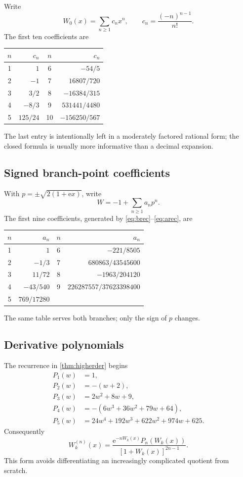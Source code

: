 \documentclass[11pt]{article}
\theoremstyle{remark}
\newcommand{\ee}{\mathrm e}
\begin{document}
Write
\[
       W_0(x)=\sum_{n\geq1}c_nx^n,
       \qquad c_n=\frac{(-n)^{n-1}}{n!}.
\]
The first ten coefficients are
\begin{center}
\begin{tabular}{@{}c r@{\qquad}c r@{}}
\toprule
\(n\)&\(c_n\)&\(n\)&\(c_n\)\\
\midrule
1&\(1\)&6&\(-54/5\)\\
2&\(-1\)&7&\(16807/720\)\\
3&\(3/2\)&8&\(-16384/315\)\\
4&\(-8/3\)&9&\(531441/4480\)\\
5&\(125/24\)&10&\(-156250/567\)\\
\bottomrule
\end{tabular}
\end{center}
The last entry is intentionally left in a moderately factored rational form;
the closed formula is usually more informative than a decimal expansion.

\subsection{Signed branch-point coefficients}

With \(p=\pm\sqrt{2(1+\ee x)}\), write
\[
       W=-1+\sum_{n\geq1}a_np^n.
\]
The first nine coefficients, generated by
\eqref{eq:brec}--\eqref{eq:arec}, are
\begin{center}
\begin{tabular}{@{}c r@{\qquad}c r@{}}
\toprule
\(n\)&\(a_n\)&\(n\)&\(a_n\)\\
\midrule
1&\(1\)&6&\(-221/8505\)\\
2&\(-1/3\)&7&\(680863/43545600\)\\
3&\(11/72\)&8&\(-1963/204120\)\\
4&\(-43/540\)&9&\(226287557/37623398400\)\\
5&\(769/17280\)&&\\
\bottomrule
\end{tabular}
\end{center}
The same table serves both branches; only the sign of \(p\) changes.

\subsection{Derivative polynomials}

The recurrence in \cref{thm:higherder} begins
\begin{align*}
 P_1(w)&=1,\\
 P_2(w)&=-(w+2),\\
 P_3(w)&=2w^2+8w+9,\\
 P_4(w)&=-(6w^3+36w^2+79w+64),\\
 P_5(w)&=24w^4+192w^3+622w^2+974w+625.
\end{align*}
Consequently
\[
 W_k^{(n)}(x)
 =\frac{\ee^{-nW_k(x)}P_n(W_k(x))}
       {[1+W_k(x)]^{2n-1}}.
\]
This form avoids differentiating an increasingly complicated quotient from
scratch.
\end{document}
